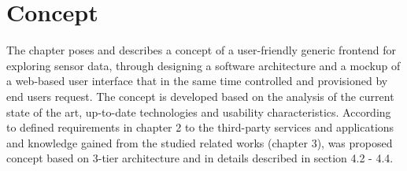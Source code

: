 \chapter{Concept}
     The chapter poses and describes a concept of a user-friendly generic frontend for exploring sensor data, 
     through designing a software architecture and a mockup of a web-based user interface that in the same time controlled and provisioned by end users request. The concept is developed based on the analysis of the current state of the art, up-to-date technologies and usability characteristics. According to defined requirements in chapter 2 to the third-party services and applications and knowledge gained from the studied related works (chapter 3), was proposed concept based on 3-tier architecture and in details described in section 4.2 - 4.4.

